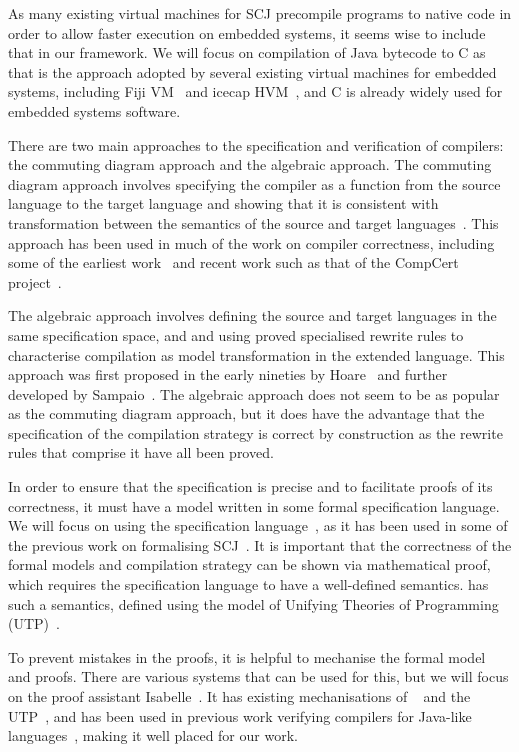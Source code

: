 \documentclass[a4paper,10pt]{report}
\begin{document}
As many existing virtual machines for SCJ precompile programs to native code in
order to allow faster execution on embedded systems, it seems wise to include
that in our framework.  We will focus on compilation of Java bytecode to C as
that is the approach adopted by several existing virtual machines for embedded
systems, including Fiji VM~\cite{pizlo2009} and icecap
HVM~\cite{sondergaard2012}, and C is already widely used for embedded systems
software.

There are two main approaches to the specification and verification of
compilers: the commuting diagram approach and the algebraic approach.  The
commuting diagram approach involves specifying the compiler as a function from
the source language to the target language and showing that it is consistent
with transformation between the semantics of the source and target
languages~\cite{morris1973, thatcher1979}.  This approach has been used in much
of the work on compiler correctness, including some of the earliest
work~\cite{mccarthy1967} and recent work such as that of the CompCert
project~\cite{leroy2009a, leroy2009b}.

The algebraic approach involves defining the source and target languages in the
same specification space, and and using proved specialised rewrite rules to
characterise compilation as model transformation in the extended language. This
approach was first proposed in the early nineties by Hoare~\cite{hoare1991} and
further developed by Sampaio~\cite{hoare1993, sampaio1993}.  The algebraic
approach does not seem to be as popular as the commuting diagram approach, but
it does have the advantage that the specification of the compilation strategy is
correct by construction as the rewrite rules that comprise it have all been
proved.

In order to ensure that the specification is precise and to facilitate proofs of
its correctness, it must have a model written in some formal specification
language.  We will focus on using the \Circus{} specification
language~\cite{oliveira2009}, as it has been used in some of the previous work
on formalising SCJ~\cite{cavalcanti2011, cavalcanti2013}.  It is important that
the correctness of the formal models and compilation strategy can be shown via
mathematical proof, which requires the specification language to have a
well-defined semantics.  \Circus{} has such a semantics, defined using the model
of Unifying Theories of Programming (UTP)~\cite{hoare1998}.

To prevent mistakes in the proofs, it is helpful to mechanise the formal model
and proofs.  There are various systems that can be used for this, but we will
focus on the proof assistant Isabelle~\cite{nipkow2002, nipkow2014}. It has
existing mechanisations of \Circus{}~\cite{joshi2012} and the
UTP~\cite{foster2015}, and has been used in previous work verifying compilers
for Java-like languages~\cite{klein2006, nipkow2000, lochbihler2010}, making it
well placed for our work.
\end{document}
